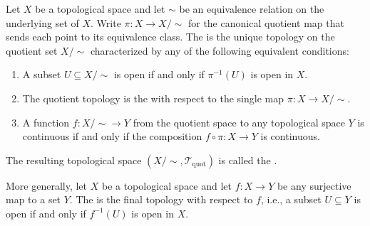 \begin{definition} \label{definition:quotient_topology_of_a_topological_space}

    Let $X$ be a topological space and let $\sim$ be an equivalence relation on the underlying set of $X$. Write $\pi : X \to X/\sim$ for the canonical quotient map that sends each point to its equivalence class. The  is the unique topology on the quotient set $X/\sim$ characterized by any of the following equivalent conditions:
    \begin{enumerate}
        \item A subset $U \subseteq X/\sim$ is open if and only if $\pi^{-1}(U)$ is open in $X$.
        \item The quotient topology is the  with respect to the single map $\pi : X \to X/\sim$.
        \item A function $f : X/\sim \to Y$ from the quotient space to any topological space $Y$ is continuous if and only if the composition $f \circ \pi : X \to Y$ is continuous.
    \end{enumerate}

    The resulting topological space $(X/\sim, \mathcal{T}_{\mathrm{quot}})$ is called the .

    More generally, let $X$ be a topological space and let $f : X \to Y$ be any surjective map to a set $Y$. The  is the final topology with respect to $f$, i.e., a subset $U \subseteq Y$ is open if and only if $f^{-1}(U)$ is open in $X$.
\end{definition}
